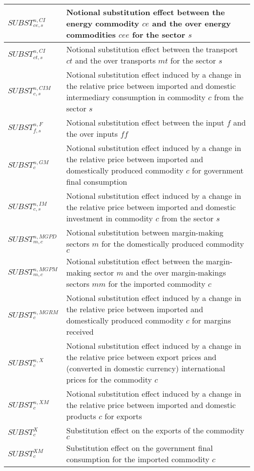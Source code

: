 \documentclass[12pt]{article}
\numberwithin{equation}{section}
\begin{document}
\begin{longtable}{@{}p{4cm}p{9cm}@{}}
 \midrule 
$SUBST^{n,CI}_{ce, s}$ & Notional substitution effect between the energy commodity $ce$ and the over energy commodities $cee$ for the sector $s$ \\
 \midrule 
$SUBST^{n,CI}_{ct, s}$ & Notional substitution effect between the transport $ct$ and the over transports $mt$ for the sector $s$ \\
 \midrule 
$SUBST^{n,CIM}_{c, s}$ & Notional substitution effect induced by a change in the relative price between imported and domestic intermediary consumption in commodity $c$ from the sector $s$ \\
 \midrule 
$SUBST^{n,F}_{f, s}$ & Notional substitution effect between the input $f$ and the over inputs $ff$ \\
 \midrule 
$SUBST^{n,GM}_{c}$ & Notional substitution effect induced by a change in the relative price between imported and domestically produced commodity $c$ for government final consumption \\
 \midrule 
$SUBST^{n,IM}_{c, s}$ & Notional substitution effect induced by a change in the relative price between imported and domestic investment in commodity $c$ from the sector $s$ \\
 \midrule 
$SUBST^{n,MGPD}_{m, c}$ & Notional substitution between margin-making sectors $m$ for the domestically produced commodity $c$ \\
 \midrule 
$SUBST^{n,MGPM}_{m, c}$ & Notional substitution effect between the margin-making sector $m$ and the over margin-makings sectors $mm$ for the imported commodity $c$ \\
 \midrule 
$SUBST^{n,MGRM}_{c}$ & Notional substitution effect induced by a change in the relative price between imported and domestically produced commodity $c$ for margins received \\
 \midrule 
$SUBST^{n,X}_{c}$ & Notional substitution effect induced by a change in the relative price between export prices and (converted in domestic currency) international prices for the commodity $c$ \\
 \midrule 
$SUBST^{n,XM}_{c}$ & Notional substitution effect induced by a change in the relative price between imported and domestic products $c$ for exports \\
 \midrule 
$SUBST^{X}_{c}$ & Substitution effect on the exports of the commodity $c$ \\
 \midrule 
$SUBST^{XM}_{c}$ & Substitution effect on the government final consumption for the imported commodity $c$ \\

\end{longtable}
\end{document}
